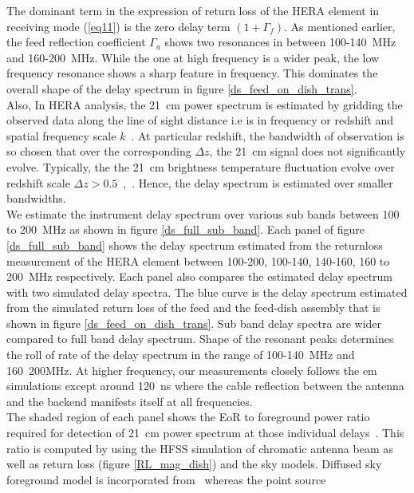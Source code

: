 \documentclass[twocolumn]{emulateapj}
\begin{document}
The dominant term in the expression of  return loss of the HERA element in
receiving mode (\ref{eq11}) is the zero delay term $(1+\Gamma_{f})$. As
mentioned earlier, the feed reflection coefficient $\Gamma_{a}$ shows two
resonances in between 100-140~MHz and 160-200~MHz. While the one at high
frequency is a wider peak, the low frequency resonance shows a sharp feature in
frequency. This dominates the overall shape of the delay spectrum in figure
\ref{ds_feed_on_dish_trans}.\\ Also, In HERA analysis, the 21~cm power spectrum
is estimated by gridding the observed data along the line of sight distance i.e
is in frequency or redshift and spatial frequency scale
$k$~\citep{liu_et_al2014a}. At particular redshift, the bandwidth of
observation is so chosen that over the corresponding $\Delta z$, the 21~cm
signal does not significantly evolve. Typically, the the 21~cm brightness
temperature fluctuation evolve over redshift scale $\Delta
z>0.5$~\citep{loeb_zaldarriaga2004},~\citep{lidz_et_al2008}. Hence, the delay
spectrum is estimated over smaller bandwidths.\\ We estimate the instrument
delay spectrum over various sub bands between 100 to 200~MHz as shown in figure
\ref{ds_full_sub_band}. Each panel of figure \ref{ds_full_sub_band} shows the
delay spectrum estimated from the returnloss measurement of the HERA element
between 100-200, 100-140, 140-160, 160 to 200~MHz respectively. Each panel also
compares the estimated delay spectrum with two simulated delay spectra. The
blue curve is the delay spectrum estimated from the simulated return loss of
the feed and the feed-dish assembly that is shown in figure
\ref{ds_feed_on_dish_trans}. Sub band delay spectra are wider compared to full
band delay spectrum.  Shape of the resonant peaks determines the roll of rate
of the delay spectrum in the range of 100-140~MHz and 160~200MHz. At higher
frequency, our measurements closely follows the em simulations except around
120~ns where the cable reflection between the antenna and the backend manifests
itself at all frequencies. \\ The shaded region of each panel shows the EoR to
foreground power ratio required for detection of 21~cm power spectrum at those
individual delays~\citep{Thyagarajan_et_al2016}. This ratio is computed by
using the HFSS simulation of chromatic antenna beam as well as return loss
(figure \ref{RL_mag_dish}) and the sky models. Diffused sky foreground model is
incorporated from~\citep{deolivieracosta_et_al2008} whereas the point source
\end{document}
